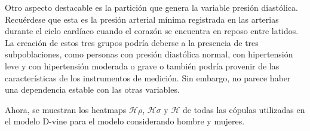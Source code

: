 Otro aspecto destacable es la partición que genera la variable presión diastólica. Recuérdese que esta es la presión arterial mínima registrada en las arterias durante el ciclo cardíaco cuando el corazón se encuentra en reposo entre latidos. La creación de estos tres grupos podría deberse a la presencia de tres subpoblaciones, como personas con presión diastólica normal, con hipertensión leve y con hipertensión moderada o grave o también podría provenir de las características de los instrumentos de medición. Sin embargo, no parece haber una dependencia estable con las otras variables.


Ahora, se muestran los heatmaps $\mathscr{H}\rho$, $\mathscr{H}\sigma$ y $\mathscr{H}$ de todas las cópulas utilizadas en el modelo D-vine para el modelo considerando hombre y mujeres. 


\begin{figure}[H]
 \centering
\end{figure}

